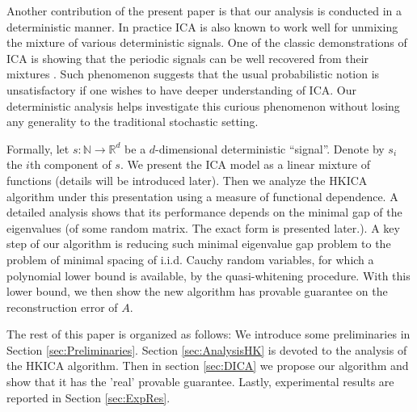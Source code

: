 \documentclass[twoside]{article}
\newcommand{\ra}{\rightarrow}
\newcommand{\real}{\mathbb{R}}
\renewcommand{\natural}{\mathbb{N}}
\theoremstyle{definition}
\begin{document}
Another contribution of the present paper is that our analysis is conducted in a deterministic manner. 
In practice ICA is also known to work well for unmixing the mixture of various deterministic signals. 
One of the classic demonstrations of ICA is showing that the periodic signals can be well recovered from their mixtures \citep{HyvOja00}.
Such phenomenon suggests that the usual probabilistic notion is unsatisfactory if one wishes to have deeper understanding of ICA.   
Our deterministic analysis helps investigate this curious phenomenon without losing any generality to the traditional stochastic setting. 

Formally, let $s:\natural \ra \real^d$ be a $d$-dimensional deterministic ``signal''. 
Denote by $s_i$ the $i$th component of $s$.
We present the ICA model as a linear mixture of functions (details will be introduced later).
Then we analyze the HKICA algorithm \citep{hsu2013learning} under this presentation using a measure of functional dependence.
A detailed analysis shows that its performance depends on the minimal gap of the eigenvalues (of some random matrix. The exact form is presented later.).
A key step of our algorithm is reducing such minimal eigenvalue gap problem to the problem of minimal spacing of i.i.d. Cauchy random variables, for which a polynomial lower bound is available, by the quasi-whitening procedure.
With this lower bound, we then show the new algorithm has provable guarantee on the reconstruction error of $A$. 

The rest of this paper is organized as follows: 
We introduce some preliminaries in Section \ref{sec:Preliminaries}. Section \ref{sec:AnalysisHK} is devoted to the analysis of the HKICA algorithm. Then in section \ref{sec:DICA} we propose our algorithm and show that it has the 'real' provable guarantee.
Lastly, experimental results are reported in Section \ref{sec:ExpRes}.
\end{document}
